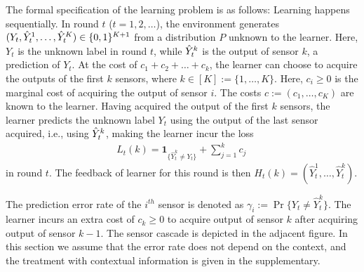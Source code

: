 The formal specification of the learning problem is as follows:
Learning happens sequentially.
In round $t$ ($t=1,2,\dots$), 
the environment generates 
$(Y_t,\hat{Y}_t^1,\dots,\hat{Y}_t^K)\in \{0,1\}^{K+1}$ from a distribution $P$ unknown to the learner.
Here, $Y_t$ is the unknown label 
 in round $t$, while $\hat{Y}_t^k$ is the output of sensor
$k$, a prediction of $Y_t$. 
At the cost of $c_1+ c_2 + \dots + c_k$,
the learner can choose to acquire the outputs of the first $k$ sensors,
where $k\in [K] := \{1,\dots,K\}$. 
Here, $c_i\ge 0$ is the marginal cost of acquiring the output of sensor $i$.
The costs $c := (c_1,\dots,c_K)$ are known to the learner.
Having acquired the output of the first $k$ sensors, the learner predicts the unknown label $Y_t$ using
the output of the last sensor acquired, i.e., using $\hat{Y}_t^k$, making the learner incur the loss
\begin{align*}
L_t(k)=\mathbf{1}_{\{\hat{Y}^k_t\neq Y_t\}}+\sum_{j=1}^k c_j\,
\end{align*}
in round $t$.
The feedback of learner for this round is then $H_t(k)=(\hat{Y}^1_t,\ldots,\hat{Y}^k_t)$.


The prediction error rate of the $i^{th}$ sensor is denoted as $\gamma_i:=\Pr\{Y_t\neq \hat{Y}^k_t\}$. The learner incurs an extra cost of $c_k\geq 0$ to acquire output of sensor $k$ after acquiring output of sensor $k-1$. The sensor cascade is depicted in the adjacent figure. In this section we assume that the error rate does not depend on the  context, and the treatment with contextual information is given in the supplementary. 
\fi

